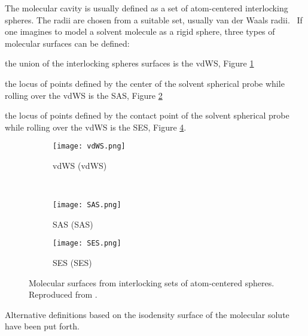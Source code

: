 The molecular cavity is usually defined as a set of atom-centered
interlocking spheres. The radii are chosen from a suitable set, usually
van der Waals radii.~\autocite{Bondi1964-dt, Mantina2009-hb}
If one imagines to model a solvent molecule as a rigid sphere,
three types of molecular surfaces can be defined:
\begin{enumerate*}[label={\alph*)},font={\color{PMS1797}}]
  \item
    the union of the interlocking spheres surfaces is the \gls{vdWS},
    Figure \ref{fig:vdWS}
  \item the locus of points defined by the center of the solvent
    spherical probe while rolling over the \acrshort{vdWS} is the
    \gls{SAS}, Figure \ref{fig:SAS}
  \item the locus of points defined by the contact point of the solvent
    spherical probe while rolling over the \acrshort{vdWS} is the \gls{SES}, Figure \ref{fig:SES}.
\end{enumerate*}
\begin{figure}[tb]
 \centering
 \begin{subfigure}{.45\textwidth}
   \centering
   \texttt{[image: vdWS.png]}
   \caption{\acrlong*{vdWS} (\acrshort{vdWS})}
   \label{fig:vdWS}
 \end{subfigure}
 ~
 \begin{subfigure}{.45\textwidth}
   \centering
   \texttt{[image: SAS.png]}
   \caption{\acrlong*{SAS} (\acrshort{SAS})}
   \label{fig:SAS}
 \end{subfigure}

 \begin{subfigure}{.45\textwidth}
   \centering
   \texttt{[image: SES.png]}
   \caption{\acrlong*{SES} (\acrshort{SES})}
   \label{fig:SES}
 \end{subfigure}
 \caption{Molecular surfaces from interlocking sets of atom-centered spheres.
 Reproduced from .}
\end{figure}
Alternative definitions based on the isodensity surface of the molecular solute
have been put forth.~\autocite{Foresman1996-wv}

